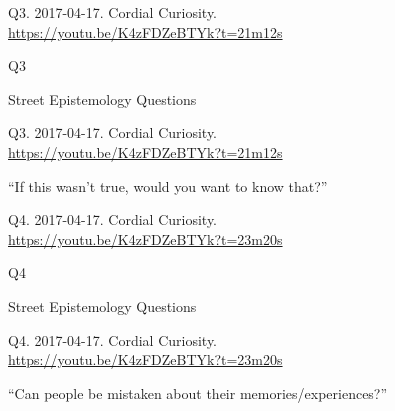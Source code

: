 \documentclass[
    src/templates/5x2-on-a4paper,
    frame
]{flashcards}
\newcommand{\myheader}{}
\newcommand{\myfooter}{
    \begin{flushright}
        \small\sc
        Street Epistemology Questions \par
    \end{flushright}
}
\begin{document}
        \renewcommand{\myheader}{
            \normalfont %
            \begin{tiny}
                Q3.
                2017-04-17.
                Cordial Curiosity.
                    \\
                    \url{ https://youtu.be/K4zFDZeBTYk?t=21m12s }
                \par
            \end{tiny}
        }
        \begin{flashcard}{
            \myheader
            \vspace{\fill}
            \begin{center}
                \large
                    Q3
            \end{center}
            \vspace{\fill}
            \myfooter
            \vspace{-1.4ex}
        }
            \myheader
            \vspace{\fill}
            \begin{center}
                \large
\enquote{If this wasn't true, would you want to know that?}            \end{center}
            \vspace{\fill}
        \end{flashcard}
        \renewcommand{\myheader}{
            \normalfont %
            \begin{tiny}
                Q4.
                2017-04-17.
                Cordial Curiosity.
                    \\
                    \url{ https://youtu.be/K4zFDZeBTYk?t=23m20s }
                \par
            \end{tiny}
        }
        \begin{flashcard}{
            \myheader
            \vspace{\fill}
            \begin{center}
                \large
                    Q4
            \end{center}
            \vspace{\fill}
            \myfooter
            \vspace{-1.4ex}
        }
            \myheader
            \vspace{\fill}
            \begin{center}
                \large
\enquote{Can people be mistaken about their memories\slash experiences?}            \end{center}
            \vspace{\fill}
        \end{flashcard}
\end{document}
